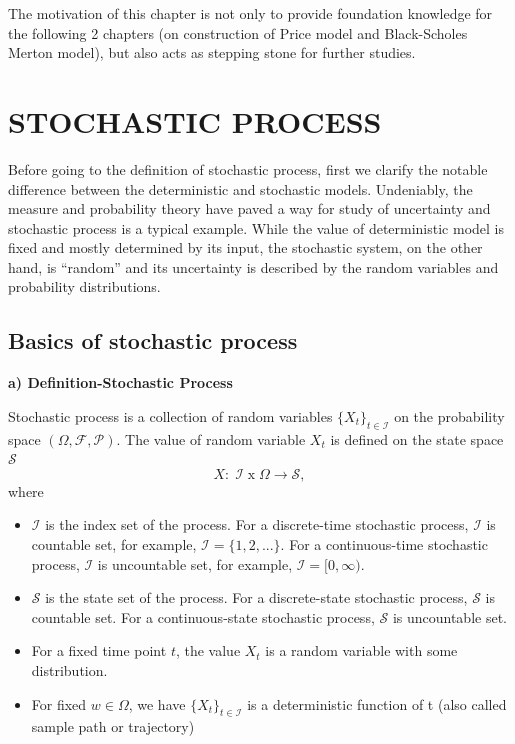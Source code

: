 \documentclass[12pt,a4paper,oneside]{book}
\begin{document}
	The motivation of this chapter is not only to provide foundation knowledge for the following 2 chapters (on construction of Price model and Black-Scholes Merton model), but also acts as stepping stone for further studies. 
	
	\section{STOCHASTIC PROCESS}
	
	Before going to the definition of stochastic process, first we clarify the notable difference between the deterministic and stochastic models. Undeniably, the measure and probability theory have paved a way for study of uncertainty and stochastic process is a typical example. While the value of deterministic model is fixed and mostly determined by its input, the stochastic system, on the other hand, is ``random'' and its uncertainty is described by the random variables and probability distributions. 
	
	\subsection{Basics of stochastic process}
	\textbf{a) Definition-Stochastic Process} 
	
	Stochastic process is a collection of random variables $\{X_t\}_{t\in \mathcal{I}}$ on the probability space $(\Omega,\mathcal{F},\mathcal{P})$. The value of random variable $X_t$ is defined on the state space $\mathcal{S}$
	\begin{equation}
	    X:\;  \mathcal{I}\; \text{x} \; \Omega \rightarrow \mathcal{S},
	\end{equation}
	where
\begin{itemize}[label=$\bullet$]
	\item $\mathcal{I}$ is the index set of the process. For a discrete-time stochastic process, $\mathcal{I}$ is countable set, for example, $\mathcal{I}= \{1,2,...\}$. For a continuous-time stochastic process, $\mathcal{I}$ is uncountable set, for example, $\mathcal{I}= [0,\infty)$.
	\item $\mathcal{S}$ is the state set of the process. For a discrete-state stochastic process, $\mathcal{S}$ is countable set. For a continuous-state stochastic process, $\mathcal{S}$ is uncountable set.
\end{itemize}

\begin{itemize}[label=$\bullet$]
	\item For a fixed time point $t$, the value $X_t$ is a random variable with some distribution.
	\item For fixed $w \in \Omega$, we have $\{X_t\}_{t\in \mathcal{I}}$ is a deterministic function of t (also called sample path or trajectory)
\end{itemize}
\end{document}
